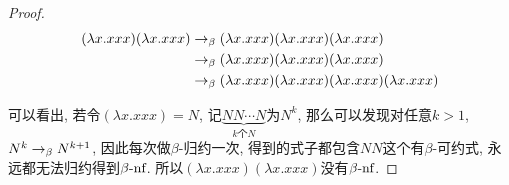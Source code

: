 \begin{proof}
	\begin{align*}
		(\lambda x.xxx)(\lambda x.xxx)&\rightarrow_{\beta} (\lambda x.xxx)(\lambda x.xxx)(\lambda x.xxx)\\
		&\rightarrow_{\beta} (\lambda x.xxx)(\lambda x.xxx)(\lambda x.xxx)\\
		&\rightarrow_{\beta} (\lambda x.xxx)(\lambda x.xxx)(\lambda x.xxx)(\lambda x.xxx)
	\end{align*}
	
	可以看出, 若令$(\lambda x.xxx)=N$, 记$\underbrace{NN\cdots N}_{k\text{个}N}$为$N^k$, 那么可以发现对任意$k>1$, $N^k\rightarrow_{\beta} N^{k+1}$, 因此每次做$\beta$-归约一次, 得到的式子都包含$NN$这个有$\beta$-可约式, 永远都无法归约得到$\beta\textrm{-nf}$. 所以$(\lambda x.xxx)(\lambda x.xxx)$没有$\beta\textrm{-nf}$.
\end{proof}